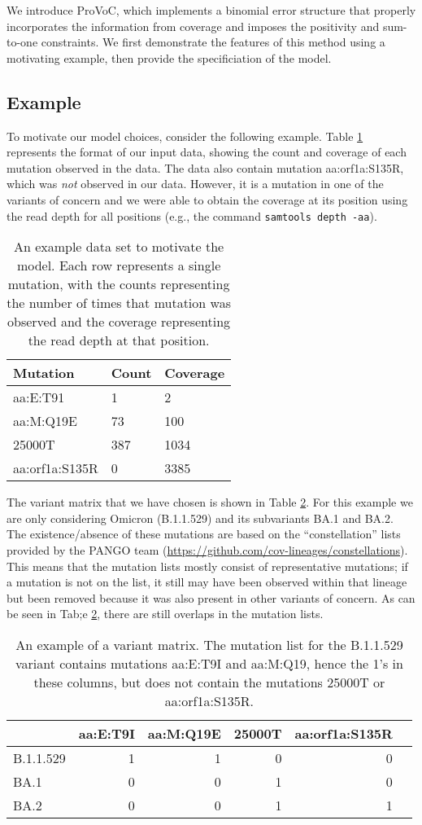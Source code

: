 \documentclass{article}
\begin{document}
We introduce ProVoC, which implements a binomial error structure that properly incorporates the information from coverage and imposes the positivity and sum-to-one constraints.
We first demonstrate the features of this method using a motivating example, then provide the specificiation of the model.

\subsection{Example}

To motivate our model choices, consider the following example.
Table \ref{toy_data} represents the format of our input data, showing the count and coverage of each mutation observed in the data.
The data also contain mutation aa:orf1a:S135R, which was \emph{not} observed in our data.
However, it is a mutation in one of the variants of concern and we were able to obtain the coverage at its position using the read depth for all positions (e.g., the command \texttt{samtools depth -aa}).

\begin{table}
\begin{tabular}{l|l|l}
Mutation & Count & Coverage\\\hline
aa:E:T91 & 1 & 2\\
aa:M:Q19E & 73 & 100\\
25000T & 387 & 1034\\
aa:orf1a:S135R & 0 & 3385
\end{tabular}
\caption{\label{toy_data}An example data set to motivate the model. Each row represents a single mutation, with the counts representing the number of times that mutation was observed and the coverage representing the read depth at that position.}
\end{table}

The variant matrix that we have chosen is shown in Table \ref{toy_varmat}. 
For this example we are only considering Omicron (B.1.1.529) and its subvariants BA.1 and BA.2.
The existence/absence of these mutations are based on the ``constellation'' lists provided by the PANGO team (\url{https://github.com/cov-lineages/constellations}).
This means that the mutation lists mostly consist of representative mutations; if a mutation is not on the list, it still may have been observed within that lineage but been removed because it was also present in other variants of concern.
As can be seen in Tab;e \ref{toy_varmat}, there are still overlaps in the mutation lists.

\begin{table}
\begin{tabular}{l|rrrrr}
& aa:E:T9I & aa:M:Q19E & 25000T & aa:orf1a:S135R\\\hline
B.1.1.529 & 1 & 1 & 0 & 0\\
BA.1 & 0 & 0 & 1 & 0\\
BA.2 & 0 & 0 & 1 & 1
\end{tabular}
\caption{\label{toy_varmat}An example of a variant matrix. The mutation list for the B.1.1.529 variant contains mutations aa:E:T9I and aa:M:Q19, hence the 1's in these columns, but does not contain the mutations 25000T or aa:orf1a:S135R.}
\end{table}
\end{document}
